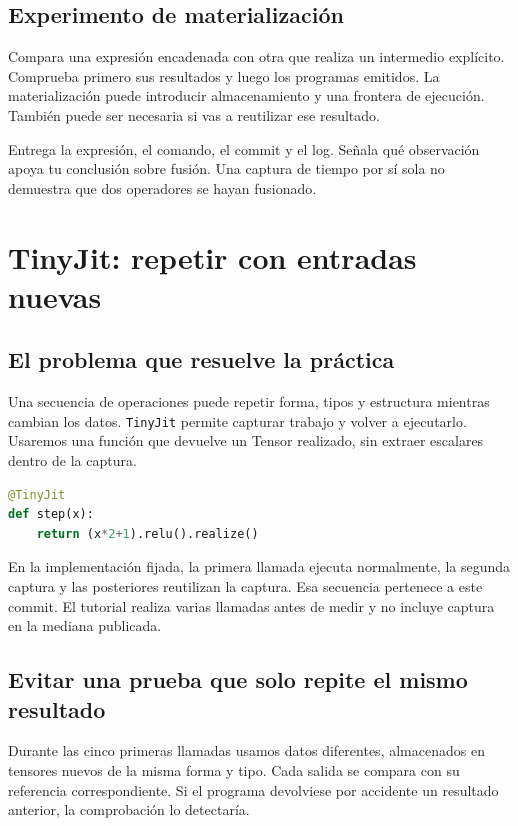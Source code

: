 \documentclass[12pt,a4paper,oneside]{report}
\begin{document}
\section{Experimento de materialización}
Compara una expresión encadenada con otra que realiza un intermedio explícito. Comprueba primero sus resultados y luego los programas emitidos. La materialización puede introducir almacenamiento y una frontera de ejecución. También puede ser necesaria si vas a reutilizar ese resultado.

\begin{comprueba}
Entrega la expresión, el comando, el commit y el log. Señala qué observación apoya tu conclusión sobre fusión. Una captura de tiempo por sí sola no demuestra que dos operadores se hayan fusionado.

\end{comprueba}
\chapter{TinyJit: repetir con entradas nuevas}
\section{El problema que resuelve la práctica}
Una secuencia de operaciones puede repetir forma, tipos y estructura mientras cambian los datos. \texttt{TinyJit} permite capturar trabajo y volver a ejecutarlo. Usaremos una función que devuelve un Tensor realizado, sin extraer escalares dentro de la captura.

\begin{lstlisting}[language=Python]
@TinyJit
def step(x):
    return (x*2+1).relu().realize()
\end{lstlisting}
En la implementación fijada, la primera llamada ejecuta normalmente, la segunda captura y las posteriores reutilizan la captura. Esa secuencia pertenece a este commit. El tutorial realiza varias llamadas antes de medir y no incluye captura en la mediana publicada. \cite{tiny-jit}

\section{Evitar una prueba que solo repite el mismo resultado}
Durante las cinco primeras llamadas usamos datos diferentes, almacenados en tensores nuevos de la misma forma y tipo. Cada salida se compara con su referencia correspondiente. Si el programa devolviese por accidente un resultado anterior, la comprobación lo detectaría.
\end{document}
